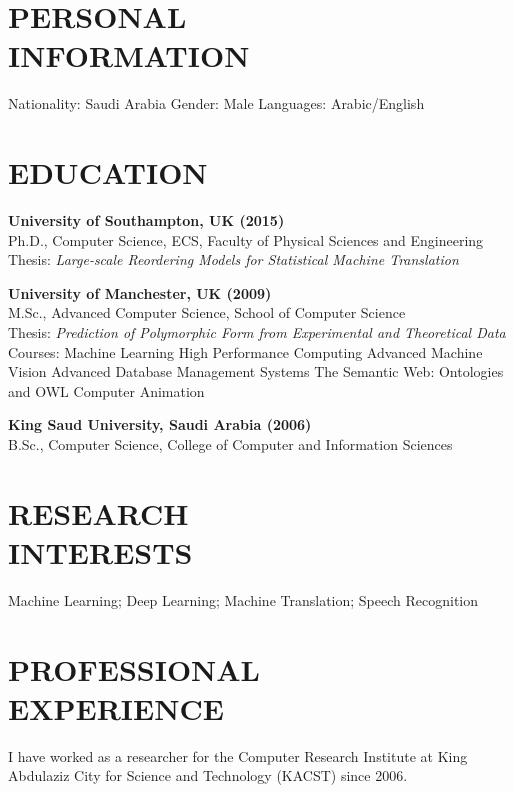 \documentclass[margin,a4paper]{res}
\begin{document}
\begin{resume}

\section{PERSONAL \\ INFORMATION} Nationality: Saudi Arabia \scalebox{4.0}{.} Gender: Male \scalebox{4.0}{.} Languages: Arabic/English\\

\section{EDUCATION}
		{\bf University of Southampton, UK (2015)}\\
		Ph.D., Computer Science, ECS, Faculty of Physical Sciences and Engineering\\
		Thesis: {\sl Large-scale Reordering Models for Statistical Machine Translation}

		{\bf University of Manchester, UK (2009)}\\
		M.Sc., Advanced Computer Science, School of Computer Science\\
		Thesis: {\sl Prediction of Polymorphic Form from Experimental and Theoretical Data}\\
		Courses: Machine Learning \scalebox{4.0}{.} High Performance Computing \scalebox{4.0}{.} Advanced Machine Vision \scalebox{4.0}{.} Advanced Database Management Systems \scalebox{4.0}{.} The Semantic Web: Ontologies and OWL \scalebox{4.0}{.} Computer Animation
		
		{\bf King Saud University, Saudi Arabia (2006)}\\
		B.Sc., Computer Science, College of Computer and Information Sciences


\section{RESEARCH\\INTERESTS} Machine Learning; Deep Learning; Machine Translation; Speech Recognition
\vspace{.1in}

\section{PROFESSIONAL\\EXPERIENCE} I have worked as a researcher for the Computer Research Institute at King Abdulaziz City for Science and Technology (KACST) since 2006.


\end{resume}
\end{document}
